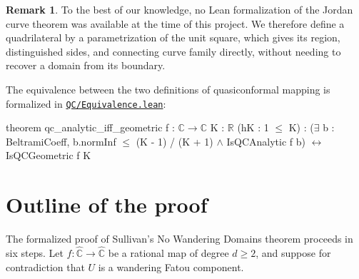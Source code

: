 \documentclass[letterpaper]{amsart}
\numberwithin{equation}{section}
\numberwithin{figure}{section}
\theoremstyle{plain}
\theoremstyle{definition}
\newtheorem{remark}[theorem]{Remark}
\newcommand{\R}{\mathbb{R}}
\newcommand{\C}{\mathbb{C}}
\newcommand{\Sphere}{\widehat{\mathbb{C}}}
\let\lean\nolinkurl
\newcommand{\leanfile}[1]{\href{https://github.com/will1491/no-wandering-domains/blob/1a39faf/NoWanderingDomains/#1}{\lean{#1}}}
\begin{document}
\begin{remark}
To the best of our knowledge, no Lean formalization of the Jordan curve theorem was available at the time of this project. We therefore define a quadrilateral by a parametrization of the unit square, which gives its region, distinguished sides, and connecting curve family directly, without needing to recover a domain from its boundary.
\end{remark}

The equivalence between the two definitions of quasiconformal mapping is formalized in \leanfile{QC/Equivalence.lean}:

\begin{leancode}
theorem qc_analytic_iff_geometric
    {f : $\C \to \C$} {K : $\R$} (hK : 1 $\leq$ K) :
  ($\exists$ b : BeltramiCoeff,
      b.normInf $\leq$ (K - 1) / (K + 1) $\land$
      IsQCAnalytic f b)
    $\leftrightarrow$ IsQCGeometric f K
\end{leancode}

\section{Outline of the proof}
\label{sec:proofs}

The formalized proof of Sullivan's No Wandering Domains theorem proceeds in six steps. Let $f\colon\Sphere\to\Sphere$ be a rational map of degree $d\geq2$, and suppose for contradiction that $U$ is a wandering Fatou component.
\end{document}
